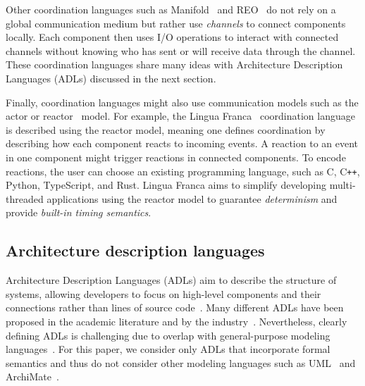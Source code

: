 \documentclass[runningheads]{llncs}
\begin{document}
Other coordination languages such as Manifold~\cite{arbabOverviewManifoldIts1993,papadopoulosModellingActivitiesInformation1998} and REO~\cite{arbabReoChannelbasedCoordination2004} do not rely on a global communication medium but rather use \textit{channels} to connect components locally.
Each component then uses I/O operations to interact with connected channels without knowing who has sent or will receive data through the channel.
These coordination languages share many ideas with Architecture Description Languages (ADLs) discussed in the next section.

Finally, coordination languages might also use communication models such as the actor or reactor~\cite{lohstrohReactorsDeterministicModel2020} model.
For example, the Lingua Franca~\cite{lohstrohReactorsDeterministicModel2020,lohstrohLinguaFrancaDeterministic2021} coordination language is described using the reactor model, meaning one defines coordination by describing how each component reacts to incoming events.
A reaction to an event in one component might trigger reactions in connected components.
To encode reactions, the user can choose an existing programming language, such as C, C\texttt{++}, Python, TypeScript, and Rust.
Lingua Franca aims to simplify developing multi-threaded applications using the reactor model to guarantee \textit{determinism} and provide \textit{built-in timing semantics}.

\subsection{Architecture description languages} \label{subsec: adl}
Architecture Description Languages (ADLs) aim to describe the structure of systems, allowing developers to focus on high-level components and their connections rather than lines of source code~\cite{clementsSurveyArchitectureDescription1996,medvidovicClassificationComparisonFramework2000,medvidovicFrameworkClassifyingComparing1997}.
Many different ADLs have been proposed in the academic literature and by the industry~\cite{medvidovicClassificationComparisonFramework2000,woodsArchitectureDescriptionLanguages2005}.
Nevertheless, clearly defining ADLs is challenging due to overlap with general-purpose modeling languages~\cite{clementsSurveyArchitectureDescription1996}.
For this paper, we consider only ADLs that incorporate formal semantics and thus do not consider other modeling languages such as UML~\cite{objectmanagementgroupUnifiedModelingLanguage2017} and ArchiMate~\cite{theopengroupArchiMateSpecification2023}.
\end{document}
